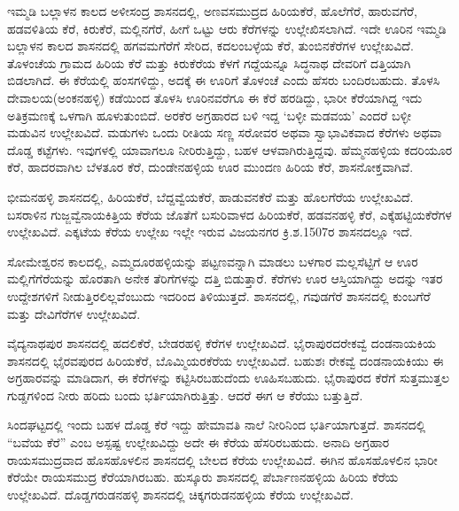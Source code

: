 ಇಮ್ಮಡಿ ಬಲ್ಲಾಳನ ಕಾಲದ ಅಳೀಸಂದ್ರ ಶಾಸನದಲ್ಲಿ, ಅಣವಸಮುದ್ರದ ಹಿರಿಯಕೆರೆ, ಹೊಲೆಗೆರೆ, ಹಾರುವಗೆರೆ, ಹಡವಳಿತಿಯ ಕೆರೆ, ಕಿರುಕೆರೆ, ಮಲ್ಲಿನಗೆರೆ, ಹೀಗೆ ಒಟ್ಟು ಆರು ಕೆರೆಗಳನ್ನು ಉಲ್ಲೇಖಿಸಲಾಗಿದೆ. ಇದೇ ಊರಿನ ಇಮ್ಮಡಿ ಬಲ್ಲಾಳನ ಕಾಲದ ಶಾಸನದಲ್ಲಿ ಹಗವಮಗೆರೆಗೆ ಸೇರಿದ, ಕದಲಂಬಳ್ಳೆಯ ಕೆರೆ, ತುಂಬಿನಕೆರೆಗಳ ಉಲ್ಲೇಖವಿದೆ. ತೊಳಂಚೆಯ ಗ್ರಾಮದ ಹಿರಿಯ ಕೆರೆ ಮತ್ತು ಕಿರುಕೆರೆಯ ಕೆಳಗೆ ಗದ್ದೆಯನ್ನೂ ಸಿದ್ಧನಾಥ ದೇವರಿಗೆ ದತ್ತಿಯಾಗಿ ಬಿಡಲಾಗಿದೆ. ಈ ಕೆರೆಯಲ್ಲಿ ಹಂಸಗಳಿದ್ದು, ಅದಕ್ಕೆ ಈ ಊರಿಗೆ ತೊಳಂಚೆ ಎಂದು ಹೆಸರು ಬಂದಿರಬಹುದು. ತೊಳಸಿ ದೇವಾಲಯ(ಅಂಕನಹಳ್ಳಿ) ಕಡೆಯಿಂದ ತೊಳಸಿ ಊರಿನವರೆಗೂ ಈ ಕೆರೆ ಹರಡಿದ್ದು, ಭಾರೀ ಕೆರೆಯಾಗಿದ್ದ ಇದು ಅತಿಕ್ರಮಣಕ್ಕೆ ಒಳಗಾಗಿ ಹೂಳುತುಂಬಿದೆ. ಅರಕೆರ ಅಗ್ರಹಾರದ ಬಳಿ ಇದ್ದ ‘ಬಳ್ಳೀ ಮಡವಯ’ ಎಂದರೆ ಬಳ್ಳೀ ಮಡುವಿನ ಉಲ್ಲೇಖವಿದೆ. ಮಡುಗಳು ಒಂದು ರೀತಿಯ ಸಣ್ಣ ಸರೋವರ ಅಥವಾ ಸ್ವಾಭಾವಿಕವಾದ ಕೆರೆಗಳು ಅಥವಾ ದೊಡ್ಡ ಕಟ್ಟೆಗಳು. ಇವುಗಳಲ್ಲಿ ಯಾವಾಗಲೂ ನೀರಿರುತ್ತಿದ್ದು, ಬಹಳ ಆಳವಾಗಿರುತ್ತಿದ್ದವು. ಹೆಮ್ಮನಹಳ್ಳಿಯ ಕದರಿಯೂರ ಕೆರೆ, ಹಾದರವಾಗಿಲ ಬೆಳತೂರ ಕೆರೆ, ದುಂಡೇನಹಳ್ಳಿಯ ಊರ ಮುಂದಣ ಹಿರಿಯ ಕೆರೆ, ಶಾಸನೋಕ್ತವಾಗಿವೆ.

ಭೀಮನಹಳ್ಳಿ ಶಾಸನದಲ್ಲಿ, ಹಿರಿಯಕೆರೆ, ಬೆದ್ದವ್ವೆಯಕೆರೆ, ಹಾಡುವನಕೆರೆ ಮತ್ತು ಹೊಲಗೆರೆಯ ಉಲ್ಲೇಖವಿದೆ. ಬಸರಾಳಿನ ಗುಜ್ಜವ್ವೆನಾಯಕಿತ್ತಿಯ ಕೆರೆಯ ಜೊತೆಗೆ ಬಸುರಿವಾಳದ ಹಿರಿಯಕೆರೆ, ಹಡವನಹಳ್ಳಿ ಕೆರೆ, ಎಕ್ಕೆಹಟ್ಟಿಯಕೆರೆಗಳ ಉಲ್ಲೇಖವಿದೆ. ಎಕ್ಕಟೆಯ ಕೆರೆಯ ಉಲ್ಲೇಖ ಇಲ್ಲೇ ಇರುವ ವಿಜಯನಗರ ಕ್ರಿ.ಶ.1507ರ ಶಾಸನದಲ್ಲೂ ಇದೆ.

ಸೋಮೇಶ್ವರನ ಕಾಲದಲ್ಲಿ, ಎಮ್ಮದೂರಹಳ್ಳಿಯನ್ನು ಪಟ್ಟಣವನ್ನಾಗಿ ಮಾಡಲು ಬಳಗಾರ ಮಲ್ಲಸೆಟ್ಟಿಗೆ ಆ ಊರ ಮಲ್ಲಿಗೆಗೆರೆಯನ್ನು ಹೊರತಾಗಿ ಅನೇಕ ತೆರಿಗೆಗಳನ್ನು ದತ್ತಿ ಬಿಡುತ್ತಾರೆ. ಕೆರೆಗಳು ಊರ ಆಸ್ತಿಯಾಗಿದ್ದು ಅದನ್ನು ಇತರ ಉದ್ದೇಶಗಳಿಗೆ ನೀಡುತ್ತಿರಲಿಲ್ಲವೆಂಬುದು ಇದರಿಂದ ತಿಳಿಯುತ್ತದೆ. ಶಾಸನದಲ್ಲಿ, ಗವುಡಗೆರೆ ಶಾಸನದಲ್ಲಿ ಕುಂಬಗೆರೆ ಮತ್ತು ದೇವಿಗೆರೆಗಳ ಉಲ್ಲೇಖವಿದೆ.

ವೈದ್ಯನಾಥಪುರ ಶಾಸನದಲ್ಲಿ ಹದಲಿಕೆರೆ, ಬೇಡರಹಳ್ಳಿ ಕೆರೆಗಳ ಉಲ್ಲೇಖವಿದೆ. ಭೈರಾಪುರದ\break ರೇಕವ್ವೆ ದಂಡನಾಯಕಿಯ ಶಾಸನದಲ್ಲಿ ಭೈರವಪುರದ ಹಿರಿಯಕೆರೆ, ಬೊಮ್ಮಿಯರಕೆರೆಯ ಉಲ್ಲೇಖವಿದೆ. ಬಹುಶಃ ರೇಕವ್ವೆ ದಂಡನಾಯಕಿಯು ಈ ಅಗ್ರಹಾರವನ್ನು ಮಾಡಿದಾಗ, ಈ ಕೆರೆಗಳನ್ನು ಕಟ್ಟಿಸಿರಬಹುದೆಂದು ಊಹಿಸಬಹುದು. ಭೈರಾಪುರದ ಕೆರೆಗೆ ಸುತ್ತಮುತ್ತಲ ಗುಡ್ಡಗಳಿಂದ ನೀರು ಹರಿದು ಬಂದು ಭರ್ತಿಯಾಗಿರುತ್ತಿತ್ತು. ಆದರೆ ಈಗ ಆ ಕೆರೆಯು ಬತ್ತುತ್ತಿದೆ.

ಸಿಂದಘಟ್ಟದಲ್ಲಿ ಇಂದು ಬಹಳ ದೊಡ್ಡ ಕೆರೆ ಇದ್ದು ಹೇಮಾವತಿ ನಾಲೆ ನೀರಿನಿಂದ ಭರ್ತಿಯಾಗುತ್ತದೆ. ಶಾಸನದಲ್ಲಿ “ಬವೆಯ ಕೆರೆ” ಎಂಬ ಅಸ್ಪಷ್ಟ ಉಲ್ಲೇಖವಿದ್ದು ಅದೇ ಈ ಕೆರೆಯ ಹೆಸರಿರಬಹುದು. ಅನಾದಿ ಅಗ್ರಹಾರ ರಾಯಸಮುದ್ರವಾದ ಹೊಸಹೊಳಲಿನ ಶಾಸನದಲ್ಲಿ ಬೇಲದ ಕೆರೆಯ ಉಲ್ಲೇಖವಿದೆ. ಈಗಿನ ಹೊಸಹೊಳಲಿನ ಭಾರೀ ಕೆರೆಯೇ ರಾಯಸಮುದ್ರ ಕೆರೆಯಾಗಿರಬಹು. ಹುಸ್ಕೂರು ಶಾಸನದಲ್ಲಿ ಪೆರ್ಬಾಣನಹಳ್ಳಿಯ ಹಿರಿಯ ಕೆರೆಯ ಉಲ್ಲೇಖವಿದೆ. ದೊಡ್ಡಗರುಡನಹಳ್ಳಿ ಶಾಸನದಲ್ಲಿ ಚಿಕ್ಕಗರುಡನಹಳ್ಳಿಯ ಕೆರೆಯ ಉಲ್ಲೇಖವಿದೆ.


